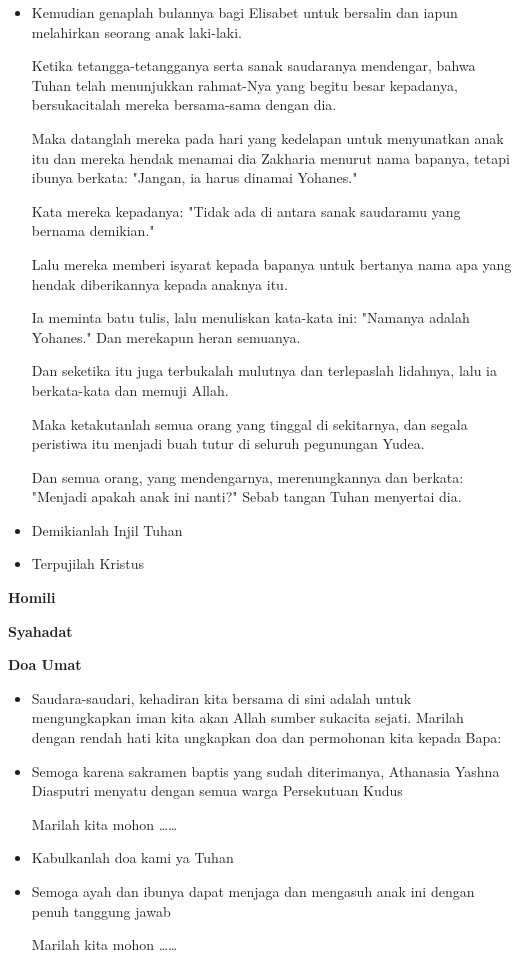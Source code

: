 \documentclass[titlepage,10pt,openany]{scrbook}
\makeatletter
\newcommand{\subjudul}[1]{%
  {\parindent \z@ 
    \interlinepenalty\@M \bfseries #1\par\nobreak \vskip 10\p@ }}
\newcommand{\BU}[1]{\begin{itemize} \item[U:] #1 \end{itemize}}
\newcommand{\BI}[1]{\begin{itemize} \item[I:] #1 \end{itemize}}
\newcommand{\BP}[1]{\begin{itemize} \item[P:] #1 \end{itemize}}
\newcommand{\namaanak}{Athanasia Yashna Diasputri}
\makeatother
\begin{document}
\BI{
Kemudian genaplah bulannya bagi Elisabet untuk bersalin dan iapun melahirkan seorang anak laki-laki.

Ketika tetangga-tetangganya serta sanak saudaranya mendengar, bahwa Tuhan telah menunjukkan rahmat-Nya yang begitu besar kepadanya, bersukacitalah mereka bersama-sama dengan dia.

Maka datanglah mereka pada hari yang kedelapan untuk menyunatkan anak itu dan mereka hendak menamai dia Zakharia menurut nama bapanya,
tetapi ibunya berkata: "Jangan, ia harus dinamai Yohanes."

Kata mereka kepadanya: "Tidak ada di antara sanak saudaramu yang bernama demikian."

Lalu mereka memberi isyarat kepada bapanya untuk bertanya nama apa yang hendak diberikannya kepada anaknya itu.

Ia meminta batu tulis, lalu menuliskan kata-kata ini: "Namanya adalah Yohanes." Dan merekapun heran semuanya.

Dan seketika itu juga terbukalah mulutnya dan terlepaslah lidahnya, lalu ia berkata-kata dan memuji Allah.

Maka ketakutanlah semua orang yang tinggal di sekitarnya, dan segala peristiwa itu menjadi buah tutur di seluruh pegunungan Yudea.

Dan semua orang, yang mendengarnya, merenungkannya dan berkata: "Menjadi apakah anak ini nanti?" Sebab tangan Tuhan menyertai dia.}


\BI{Demikianlah Injil Tuhan}

\BU{Terpujilah Kristus}

 

\subjudul{Homili}

\subjudul{Syahadat} 

\subjudul{Doa Umat}
\BP{Saudara-saudari, kehadiran kita bersama di sini adalah untuk mengungkapkan iman kita akan Allah sumber sukacita sejati. Marilah dengan rendah hati kita ungkapkan doa dan permohonan kita kepada Bapa:}

\BP{Semoga karena sakramen baptis yang sudah diterimanya, \namaanak{} menyatu dengan semua warga Persekutuan Kudus

Marilah kita mohon \ldots\ldots
}

\BU{Kabulkanlah doa kami ya Tuhan}

\BU{Semoga ayah dan ibunya dapat menjaga dan mengasuh anak ini dengan penuh tanggung jawab

Marilah kita mohon \ldots\ldots
}
\end{document}

